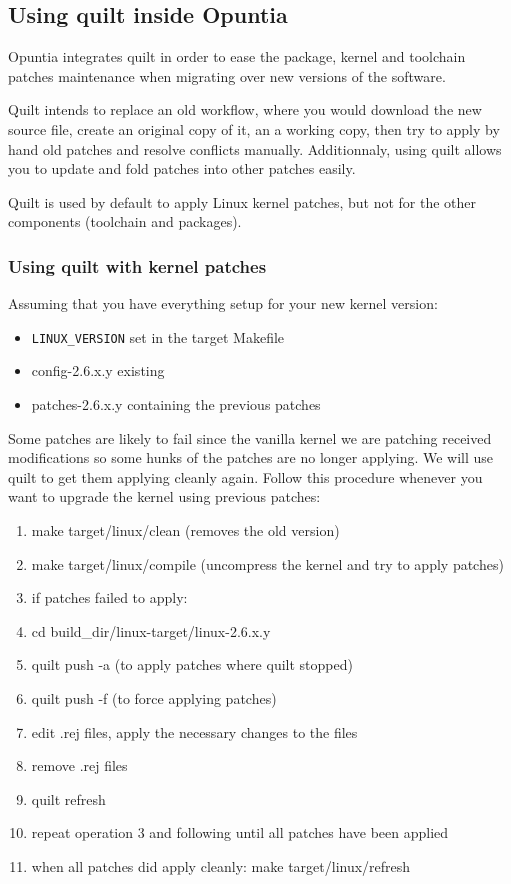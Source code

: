 \subsection{Using quilt inside Opuntia}

Opuntia integrates quilt in order to ease the package, kernel and toolchain
patches maintenance when migrating over new versions of the software.

Quilt intends to replace an old workflow, where you would download the new
source file, create an original copy of it, an a working copy, then try to
apply by hand old patches and resolve conflicts manually. Additionnaly, using
quilt allows you to update and fold patches into other patches easily.

Quilt is used by default to apply Linux kernel patches, but not for the other
components (toolchain and packages).

\subsubsection{Using quilt with kernel patches}

Assuming that you have everything setup for your new kernel version:
\begin{itemize}
\item \texttt{LINUX\_VERSION} set in the target Makefile
\item config-2.6.x.y existing
\item patches-2.6.x.y containing the previous patches
\end{itemize}

Some patches are likely to fail since the vanilla kernel we are patching
received modifications so some hunks of the patches are no longer applying.
We will use quilt to get them applying cleanly again. Follow this procedure
whenever you want to upgrade the kernel using previous patches:

\begin{enumerate}
\item make target/linux/clean (removes the old version)
\item make target/linux/compile (uncompress the kernel and try to apply patches)
\item if patches failed to apply:
\item cd build\_dir/linux-target/linux-2.6.x.y
\item quilt push -a (to apply patches where quilt stopped)
\item quilt push -f (to force applying patches)
\item edit .rej files, apply the necessary changes to the files
\item remove .rej files
\item quilt refresh
\item repeat operation 3 and following until all patches have been applied
\item when all patches did apply cleanly: make target/linux/refresh
\end{enumerate}

